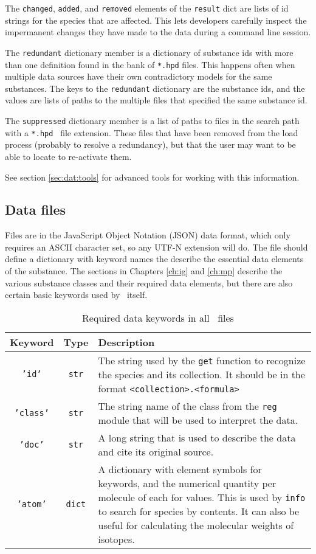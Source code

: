 The \texttt{changed}, \texttt{added}, and \texttt{removed} elements of the \texttt{result} dict are lists of id strings for the species that are affected.  This lets developers carefully inspect the impermanent changes they have made to the data during a command line session.

The \texttt{redundant} dictionary member is a dictionary of substance ids with more than one definition found in the bank of \texttt{*.hpd} files.  This happens often when multiple data sources have their own contradictory models for the same substances.  The keys to the \texttt{redundant} dictionary are the substance ids, and the values are lists of paths to the multiple files that specified the same substance id.

The \texttt{suppressed} dictionary member is a list of paths to files in the search path with a \texttt{*.hpd~} file extension.  These files that have been removed from the load process (probably to resolve a redundancy), but that the user may want to be able to locate to re-activate them.

See section \ref{sec:dat:tools} for advanced tools for working with this information.

\subsection{Data files}\label{sec:regdat:data}

Files are in the JavaScript Object Notation (JSON) data format, which only requires an ASCII character set, so any UTF-N extension will do.  The file should define a dictionary with keyword names the describe the essential data elements of the substance.  The sections in Chapters \ref{ch:ig} and \ref{ch:mp} describe the various substance classes and their required data elements, but there are also certain basic keywords used by \PM\ itself.

\begin{table}
\centering
\caption{Required data keywords in all \PM\ files}\label{tab:dat:required}
\begin{tabular}{|ccp{2.5in}|}
\hline
Keyword & Type & Description\\
\hline
\texttt{'id'} & \texttt{str} & The string used by the \texttt{get} function to recognize the species and its collection.  It should be in the format \texttt{<collection>.<formula>}\\
\texttt{'class'} & \texttt{str} & The string name of the class from the \texttt{reg} module that will be used to interpret the data.\\
\texttt{'doc'} & \texttt{str} & A long string that is used to describe the data and cite its original source.\\
\texttt{'atom'} & \texttt{dict} & A dictionary with element symbols for keywords, and the numerical quantity per molecule of each for values.  This is used by \texttt{info} to search for species by contents.  It can also be useful for calculating the molecular weights of isotopes.\\
\hline
\end{tabular}
\end{table}

